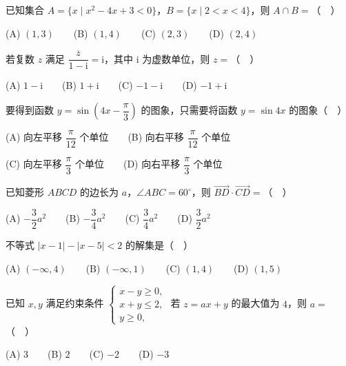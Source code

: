 

\begin{question}

已知集合 $A=\{x\mid x^2-4x+3<0\}$，$B=\{x\mid 2<x<4\}$，则 $A\cap B=$（　）

(A) $(1,3)$　　(B) $(1,4)$　　(C) $(2,3)$　　(D) $(2,4)$

\end{question}
\begin{question}

若复数 $z$ 满足 $\dfrac{\overline{z}}{1-\mathrm{i}}=\mathrm{i}$，其中 $\mathrm{i}$ 为虚数单位，则 $z=$（　）

(A) $1-\mathrm{i}$　　(B) $1+\mathrm{i}$　　(C) $-1-\mathrm{i}$　　(D) $-1+\mathrm{i}$

\end{question}
\begin{question}

要得到函数 $y=\sin\left(4x-\dfrac{\pi}{3}\right)$ 的图象，只需要将函数 $y=\sin 4x$ 的图象（　）

(A) 向左平移 $\dfrac{\pi}{12}$ 个单位　　(B) 向右平移 $\dfrac{\pi}{12}$ 个单位

(C) 向左平移 $\dfrac{\pi}{3}$ 个单位　　(D) 向右平移 $\dfrac{\pi}{3}$ 个单位

\end{question}
\begin{question}

已知菱形 $ABCD$ 的边长为 $a$，$\angle ABC=60^\circ$，则 $\overrightarrow{BD}\cdot\overrightarrow{CD}=$（　）

(A) $-\dfrac{3}{2}a^2$　　(B) $-\dfrac{3}{4}a^2$　　(C) $\dfrac{3}{4}a^2$　　(D) $\dfrac{3}{2}a^2$

\end{question}
\begin{question}

不等式 $|x-1|-|x-5|<2$ 的解集是（　）

(A) $(-\infty,4)$　　(B) $(-\infty,1)$　　(C) $(1,4)$　　(D) $(1,5)$

\end{question}
\begin{question}

已知 $x,y$ 满足约束条件 $\begin{cases}x-y\geqslant 0,\\x+y\leqslant 2,\\y\geqslant 0,\end{cases}$ 若 $z=ax+y$ 的最大值为 $4$，则 $a=$（　）

(A) $3$　　(B) $2$　　(C) $-2$　　(D) $-3$

\end{question}
